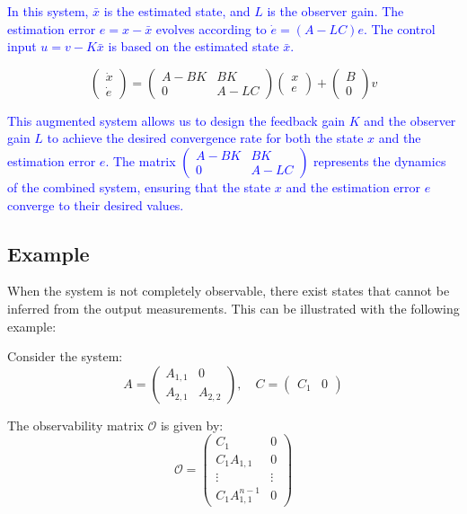 \documentclass{article}
\begin{document}
\textcolor{blue}{
In this system, $\bar{x}$ is the estimated state, and $L$ is the observer gain. The estimation error $e = x - \bar{x}$ evolves according to $\dot{e} = (A - LC)e$. The control input $u = v - K\bar{x}$ is based on the estimated state $\bar{x}$.
}

\[
\begin{pmatrix}
\dot{x} \\
\dot{e}
\end{pmatrix}
=
\begin{pmatrix}
A - BK & BK \\
0 & A - LC
\end{pmatrix}
\begin{pmatrix}
x \\
e
\end{pmatrix}
+
\begin{pmatrix}
B \\
0
\end{pmatrix}
v
\]

\textcolor{blue}{
This augmented system allows us to design the feedback gain $K$ and the observer gain $L$ to achieve the desired convergence rate for both the state $x$ and the estimation error $e$. The matrix $\begin{pmatrix} A - BK & BK \\ 0 & A - LC \end{pmatrix}$ represents the dynamics of the combined system, ensuring that the state $x$ and the estimation error $e$ converge to their desired values.
}

\subsection{Example}

When the system is not completely observable, there exist states that cannot be inferred from the output measurements. This can be illustrated with the following example:

Consider the system:
\[
A = \begin{pmatrix}
A_{1,1} & 0 \\
A_{2,1} & A_{2,2}
\end{pmatrix}, \quad C = \begin{pmatrix}
C_1 & 0
\end{pmatrix}
\]

The observability matrix $\mathcal{O}$ is given by:
\[
\mathcal{O} = \begin{pmatrix}
C_1 & 0 \\
C_1 A_{1,1} & 0 \\
\vdots & \vdots \\
C_1 A_{1,1}^{n-1} & 0
\end{pmatrix}
\]
\end{document}
